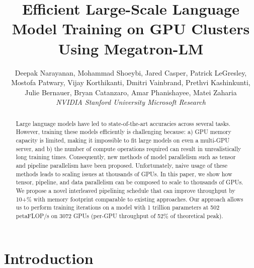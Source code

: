 \documentclass[sigconf,nonacm]{acmart}
\title{Efficient Large-Scale Language Model Training on GPU Clusters Using Megatron-LM}
\author{
\rm{Deepak Narayanan\stanford\ack, Mohammad Shoeybi\nv, Jared Casper\nv, Patrick LeGresley\nv, \\ Mostofa Patwary\nv, Vijay Korthikanti\nv, Dmitri Vainbrand\nv, Prethvi Kashinkunti\nv, \\ Julie Bernauer\nv, Bryan Catanzaro\nv, Amar Phanishayee\msr, Matei Zaharia\stanford}
\\
\rm{\textit{\nv NVIDIA\hspace{0.02in} \stanford Stanford University\hspace{0.02in} \msr Microsoft Research}}
}
\begin{document}
\begin{abstract}

Large language models have led to state-of-the-art accuracies across several tasks. However, training these models efficiently is challenging because: a) GPU memory capacity is limited, making it impossible to fit large models on even a multi-GPU server, and b) the number of compute operations required can result in unrealistically long training times. Consequently, new methods of model parallelism such as tensor and pipeline parallelism have been proposed. Unfortunately, naive usage of these methods leads to scaling issues at thousands of GPUs. In this paper, we show how tensor, pipeline, and data parallelism can be composed to scale to thousands of GPUs. We propose a novel interleaved pipelining schedule that can improve throughput by 10+\% with memory footprint comparable to existing approaches. Our approach allows us to perform training iterations on a model with 1 trillion parameters at 502 petaFLOP/s on 3072 GPUs (per-GPU throughput of 52\% of theoretical peak).

\end{abstract}

\maketitle

\renewcommand{\shortauthors}{}

\section{Introduction}
\end{document}
